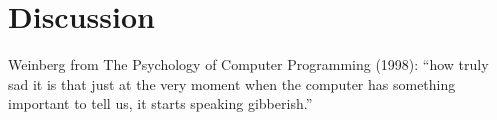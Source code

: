 \newcommand{\discussionSection}{Discussion}
\section{\protect\discussionSection} %
\label{sec:discussion}

Weinberg from The Psychology of Computer Programming (1998): ``how truly sad it is that just at the very moment
when the computer has something important to tell us, it starts
speaking gibberish.''


